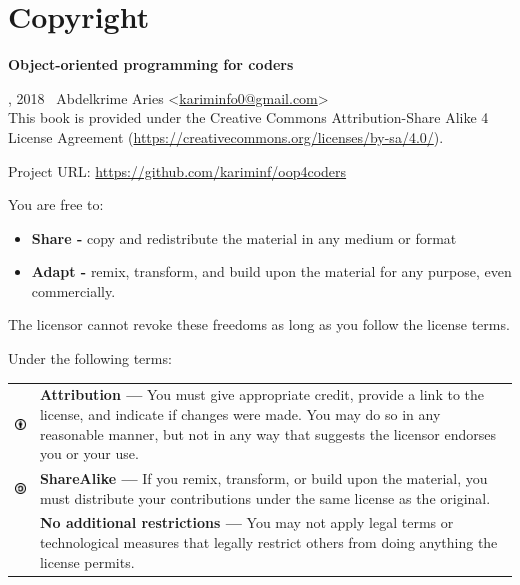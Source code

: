 \documentclass[12pt]{book}
\begin{document}
\fi

\chapter*{Copyright}

\begin{center}
	{\Huge \textbf{Object-oriented programming for coders}}
\end{center}


, 2018  \textcopyright\ Abdelkrime Aries <\href{mailto://kariminfo0@gmail.com}{kariminfo0@gmail.com}> \\[0.5cm]
This book is provided under the Creative Commons Attribution-Share Alike 4 License Agreement (\url{https://creativecommons.org/licenses/by-sa/4.0/}).

\vspace{0.5cm}
\noindent
Project URL: \url{https://github.com/kariminf/oop4coders}

\vspace{1cm}

\scriptsize %
\vspace{1cm}
\noindent
You are free to:
\begin{itemize}
\item \textbf{Share -} copy and redistribute the material in any medium or format
\item \textbf{Adapt -} remix, transform, and build upon the material for any purpose, even commercially.
\end{itemize}
The licensor cannot revoke these freedoms as long as you follow the license terms.

\vspace{1cm}
\noindent
Under the following terms:\\
\begin{tabular}{m{}m{}}
%
\includegraphics[width=1cm]{img/by.png} & 
\textbf{Attribution —} You must give appropriate credit, provide a link to the license, and indicate if changes were made. You may do so in any reasonable manner, but not in any way that suggests the licensor endorses you or your use. \\
%
\includegraphics[width=1cm]{img/sa.png} &
\textbf{ShareAlike —} If you remix, transform, or build upon the material, you must distribute your contributions under the same license as the original.\\
%
&
\textbf{No additional restrictions —} You may not apply legal terms or technological measures that legally restrict others from doing anything the license permits.
%
\end{tabular}
\end{document}

